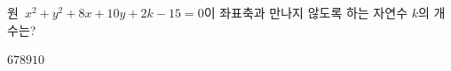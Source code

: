 원~$x^2+y^2+8x+10y+2k-15=0$이 좌표축과 만나지 않도록 하는 자연수 $k$의 개수는?
\begin{choices32}{$6$}{$7$}{$8$}{$9$}{$10$}\end{choices32}

